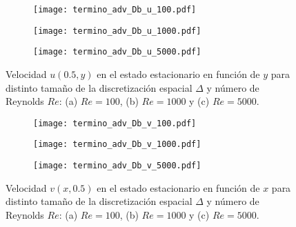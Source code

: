 \documentclass[aps,prb,twocolumn,superscriptaddress,floatfix,longbibliography,10pt]{revtex4-2}
\newcounter{para}
\begin{document}
\begin{figure}
  \centering
  \begin{subfigure}[b]{0.32\textwidth}
      \centering
      \texttt{[image: termino\_adv\_Db\_u\_100.pdf]}
      \caption{}
      \label{fig:termino_adv_Db_u_100}
  \end{subfigure}
  \hfill
  \begin{subfigure}[b]{0.32\textwidth}
      \centering
      \texttt{[image: termino\_adv\_Db\_u\_1000.pdf]}
      \caption{}
      \label{fig:termino_adv_Db_u_1000}
  \end{subfigure}
  \hfill
  \begin{subfigure}[b]{0.32\textwidth}
      \centering
      \texttt{[image: termino\_adv\_Db\_u\_5000.pdf]}
      \caption{}
      \label{fig:termino_adv_Db_u_5000}
  \end{subfigure}
     \caption{Velocidad $u(0.5,y)$ en el estado estacionario en función de $y$ para distinto tamaño de la discretización espacial $\Delta$ y número de Reynolds $Re$: (a) $Re = 100$, (b) $Re = 1000$ y (c) $Re = 5000$.}
     \label{fig:velocidades_u_DC2_vs_Re}
\end{figure}

\begin{figure}
  \centering
  
  \begin{subfigure}[b]{0.32\textwidth}
    \centering
    \texttt{[image: termino\_adv\_Db\_v\_100.pdf]}
    \caption{}
    \label{fig:termino_adv_Db_v_100}
\end{subfigure}
\hfill
\begin{subfigure}[b]{0.32\textwidth}
    \centering
    \texttt{[image: termino\_adv\_Db\_v\_1000.pdf]}
    \caption{}
    \label{fig:termino_adv_Db_v_1000}
\end{subfigure}
\hfill
\begin{subfigure}[b]{0.32\textwidth}
    \centering
    \texttt{[image: termino\_adv\_Db\_v\_5000.pdf]}
    \caption{}
    \label{fig:termino_adv_Db_v_5000}
\end{subfigure}
     \caption{Velocidad $v(x,0.5)$ en el estado estacionario en función de $x$ para distinto tamaño de la discretización espacial $\Delta$ y número de Reynolds $Re$: (a) $Re = 100$, (b) $Re = 1000$ y (c) $Re = 5000$.}
     \label{fig:velocidades_v_DC2_vs_Re}
\end{figure}
\end{document}

